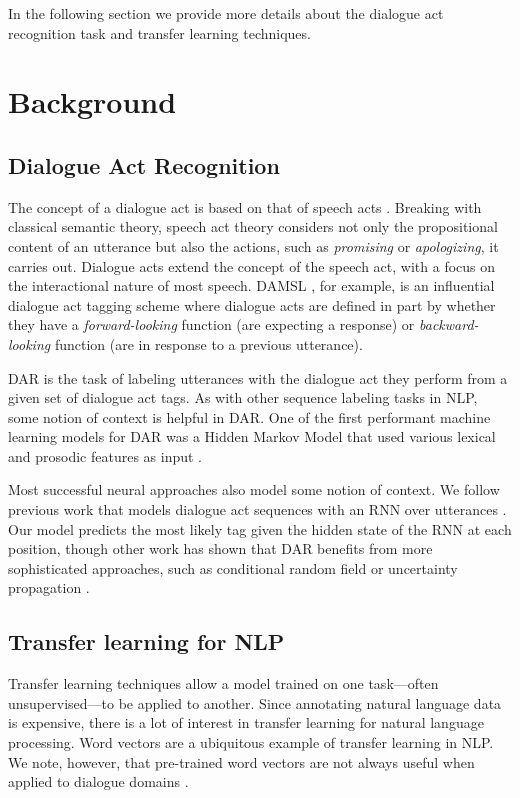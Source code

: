 \documentclass[11pt,a4paper]{article}
\begin{document}
In the following section we provide more details about the dialogue act recognition task and transfer learning techniques. 


\section{Background}\label{sec:background}

\subsection{Dialogue Act Recognition}\label{sec:DAR}
The concept of a dialogue act is based on that of speech acts \citep{austinHowThingsWords2009}.
Breaking with classical semantic theory, speech act theory considers not only the propositional content of an utterance but also the actions, such as \emph{promising} or \emph{apologizing}, it carries out.
Dialogue acts extend the concept of the speech act, with a focus on the interactional nature of most speech.
DAMSL \citep{coreCodingDialogsDAMSL1997}, for example, is an influential dialogue act tagging scheme where dialogue acts are defined in part by whether they have a \emph{forward-looking} function (are expecting a response) or \emph{backward-looking} function (are in response to a previous utterance).

DAR is the task of labeling utterances with the dialogue act they perform from a given set of dialogue act tags.
As with other sequence labeling tasks in NLP, some notion of context is helpful in DAR.
One of the first performant machine learning models for DAR was a Hidden Markov Model that used various lexical and prosodic features as input \citep{stolckeDialogueActModeling2000}.

Most successful neural approaches also model some notion of context.
We follow previous work that models dialogue act sequences with an RNN over utterances \citep{kalchbrennerRecurrentConvolutionalNeural2013,tranHierarchicalNeuralModel2017,botheContextbasedApproachDialogue2018}.
Our model predicts the most likely tag given the hidden state of the RNN at each position, though other work has shown that DAR benefits from more sophisticated approaches, such as conditional random field \citep{chenDialogueActRecognition2017} or uncertainty propagation \citep{tranPreservingDistributionalInformation2017}. 

\subsection{Transfer learning for NLP}
Transfer learning techniques allow a model trained on one task---often unsupervised---to be applied to another. 
Since annotating natural language data is expensive, there is a lot of interest in transfer learning for natural language processing. 
Word vectors \citep[e.g.,][]{mikolovDistributedRepresentationsWords2013,penningtonGloveGlobalVectors2014} are a ubiquitous example of transfer learning in NLP.
We note, however, that pre-trained word vectors are not always useful when applied to dialogue domains \cite{cerisaraEffectsUsingWord2vec2017}. 
\end{document}

